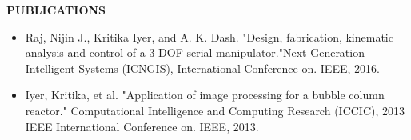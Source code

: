 \documentclass[10pt,a4paper]{article}
\begin{document}
\textbf{PUBLICATIONS}
\begin{itemize}
  \item Raj, Nijin J., Kritika Iyer, and A. K. Dash. "Design, fabrication, kinematic analysis and control of a 3-DOF serial manipulator."Next Generation Intelligent Systems (ICNGIS), International Conference on. IEEE, 2016.
  \item Iyer, Kritika, et al. "Application of image processing for a bubble column reactor." Computational  Intelligence and Computing Research (ICCIC), 2013 IEEE International Conference on. IEEE, 2013.
\end{itemize}
\end{document}
